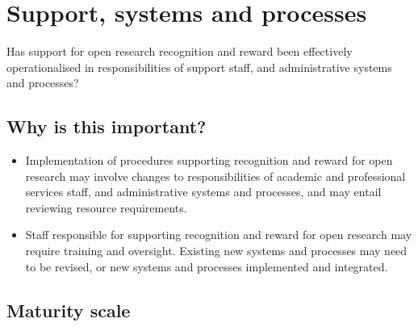 \documentclass[
  letterpaper,
  DIV=11,
  numbers=noendperiod,
  oneside]{scrreprt}
\begin{document}

\chapter{Support, systems and
processes}\label{support-systems-and-processes}

\begin{tcolorbox}[enhanced jigsaw, colback=white, toprule=.15mm, colframe=quarto-callout-color-frame, arc=.35mm, opacityback=0, bottomrule=.15mm, breakable, left=2mm, leftrule=.75mm, rightrule=.15mm]

Has support for open research recognition and reward been effectively
operationalised in responsibilities of support staff, and administrative
systems and processes?

\end{tcolorbox}

\section{Why is this important?}\label{why-is-this-important-5}

\begin{itemize}
\item
  Implementation of procedures supporting recognition and reward for
  open research may involve changes to responsibilities of academic and
  professional services staff, and administrative systems and processes,
  and may entail reviewing resource requirements.
\item
  Staff responsible for supporting recognition and reward for open
  research may require training and oversight. Existing new systems and
  processes may need to be revised, or new systems and processes
  implemented and integrated.
\end{itemize}

\section{Maturity scale}\label{maturity-scale-5}
\end{document}
